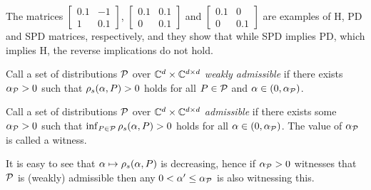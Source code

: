 \begin{example}
The matrices $\begin{bmatrix}0.1 &-1\\ 1 & 0.1\end{bmatrix}$, $\begin{bmatrix} 0.1 & 0.1 \\ 0 & 0.1\end{bmatrix}$ and $\begin{bmatrix}0.1 &0 \\ 0 & 0.1\end{bmatrix}$ are examples of H, PD and SPD matrices, respectively, and they show that while SPD implies PD, which implies H, the reverse implications do not hold.
\end{example}

\begin{definition}
Call a set of distributions $\P$ over $\C^{d}\times \C^{\dcd}$
\emph{weakly admissible} if there exists $\alpha_{\P}>0$ such that
$\rhos{P}>0$ holds for all $P\in \P$ and $\alpha\in(0,\alpha_{\P})$.
\end{definition}
\begin{definition}
Call a set of distributions $\P$ over $\C^{d}\times \C^{\dcd}$ \emph{admissible}
if there exists some $\alpha_{\P}>0$ such that $\inf_{P\in \P} \rhos{P}>0$ holds for all $\alpha\in(0,\alpha_{\P})$.
The value of $\alpha_{\P}$ is called a witness.
\end{definition}

It is easy to see that $\alpha \mapsto \rhos{P}$ is decreasing,
hence if $\alpha_{\P}>0$ witnesses that $\P$ is (weakly) admissible
then any $0<\alpha'\le \alpha_{\P}$ is also witnessing this.
